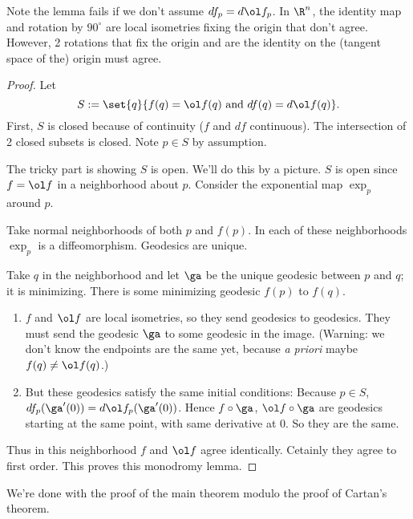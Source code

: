 Note the lemma fails if we don't assume $df_p=d\ol f_{p}$. In $\R^n$, the identity map and rotation by $90^{\circ}$ are local isometries fixing the origin that don't agree. However, 2 rotations that fix the origin and are the identity on the (tangent space of the) origin must agree. 
\begin{proof}
Let
\[
S:=\set{q}{f(q)=\ol f(q)\text{ and }df(q)=d\ol f(q)}.
\]
First, $S$ is closed because of continuity ($f$ and $df$ continuous). The intersection of 2 closed subsets is closed. Note $p\in S$ by assumption.

The tricky part is showing $S$ is open. We'll do this by a picture.  $S$ is open since $f=\ol f$ in a neighborhood about $p$. Consider the exponential map $\exp_p$ around $p$.


Take normal neighborhoods of both $p$ and $f(p)$. In each of these neighborhoods $\exp_p$ is a diffeomorphism. 
Geodesics are unique.

Take $q$ in the neighborhood and let $\ga$ be the unique geodesic between $p$ and $q$; it is minimizing. There is some minimizing geodesic $f(p)$ to $f(q)$. 
\begin{enumerate}
\item
$f$ and $\ol f$ are local isometries, so they send geodesics to geodesics. They must send the geodesic $\ga$ to some geodesic in the image. (Warning: we don't know the endpoints are the same yet, because {\it a priori} maybe $f(q)\ne \ol f(q)$.)
\item
But these geodesics satisfy the same initial conditions: Because $p\in S$, $df_p(\ga'(0))=d\ol f_p(\ga'(0))$. Hence $f\circ \ga$, $\ol f\circ \ga$ are geodesics starting at the same point, with same derivative at 0. So they are the same.
\end{enumerate} 
Thus in this neighborhood $f$ and $\ol f$ agree identically. Cetainly they agree to first order. This proves this monodromy lemma.
\end{proof}
We're done with the proof of the main theorem modulo the proof of Cartan's theorem.
